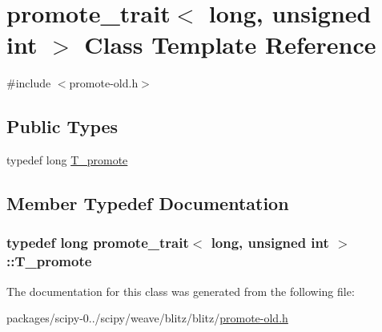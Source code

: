 \hypertarget{classpromote__trait_3_01long_00_01unsigned_01int_01_4}{}\section{promote\+\_\+trait$<$ long, unsigned int $>$ Class Template Reference}
\label{classpromote__trait_3_01long_00_01unsigned_01int_01_4}


{\ttfamily \#include $<$promote-\/old.\+h$>$}

\subsection*{Public Types}
\begin{DoxyCompactItemize}
\item 
typedef long \hyperlink{classpromote__trait_3_01long_00_01unsigned_01int_01_4_af54f6dd53dc5fe3ff55eb2523df83a36}{T\+\_\+promote}
\end{DoxyCompactItemize}


\subsection{Member Typedef Documentation}
\hypertarget{classpromote__trait_3_01long_00_01unsigned_01int_01_4_af54f6dd53dc5fe3ff55eb2523df83a36}{}
\subsubsection[{T\+\_\+promote}]{\setlength{\rightskip}{0pt plus 5cm}typedef long {\bf promote\+\_\+trait}$<$ long, unsigned int $>$\+::{\bf T\+\_\+promote}}\label{classpromote__trait_3_01long_00_01unsigned_01int_01_4_af54f6dd53dc5fe3ff55eb2523df83a36}


The documentation for this class was generated from the following file\+:\begin{DoxyCompactItemize}
\item 
packages/scipy-\/0../scipy/weave/blitz/blitz/\hyperlink{promote-old_8h}{promote-\/old.\+h}\end{DoxyCompactItemize}
